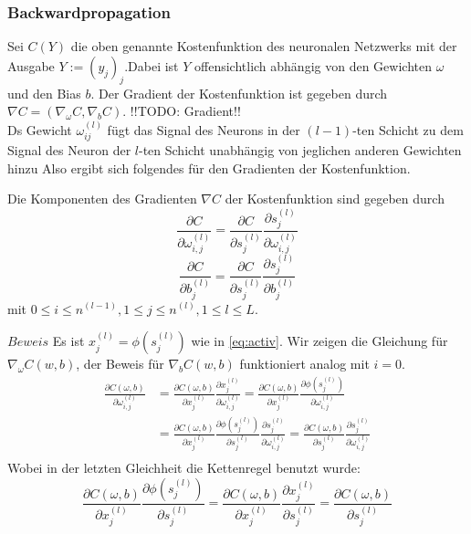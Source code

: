\subsubsection{Backwardpropagation}
Sei $C(Y)$ die oben genannte Kostenfunktion des neuronalen Netzwerks mit der Ausgabe $Y:=(y_j)_j$.Dabei ist $Y$
offensichtlich abhängig von den Gewichten $\omega$ und den Bias $b$. Der Gradient der Kostenfunktion ist gegeben durch
$\nabla C=(\nabla_{\omega}C,\nabla_{b}C).$  !!TODO: Gradient!!\\
Ds Gewicht $\omega_{ij}^{(l)}$ fügt das Signal des Neurons in der $(l-1)$-ten Schicht zu dem Signal des Neuron der $l$-ten
Schicht unabhängig von jeglichen anderen Gewichten hinzu Also ergibt sich folgendes für den Gradienten der
Kostenfunktion.
\begin{satz}
    \label{machine-cost-grad}
    Die Komponenten des Gradienten $\nabla C$ der Kostenfunktion sind gegeben durch
    \[
        \frac{\partial C}{\partial \omega_{i,j}^{(l)}} = \frac{\partial C}{\partial s_{j}^{(l)}} \frac{\partial s_{j}^{(l)}}{\partial \omega_{i,j}^{(l)}}
    \]
    \[
        \frac{\partial C}{\partial b_{j}^{(l)}} = \frac{\partial C}{\partial s_{j}^{(l)}} \frac{\partial s_{j}^{(l)}}{\partial b_j^{(l)}}
    \]
    mit $0\leq i \leq n^{(l-1)}, 1\leq j \leq n^{(l)}, 1 \leq l \leq L$.
\end{satz}
$Beweis$ Es ist $x_j^{(l)}=\phi(s_j^{(l)})$ wie in \eqref{eq:activ}. Wir zeigen die Gleichung für
$\nabla_{\omega}C(w,b)$, der Beweis für  $\nabla_{b}C(w,b)$ funktioniert analog mit $i=0$.
\begin{align*}
    \frac{\partial C(\omega,b)}{\partial \omega_{i,j}^{(l)}} &= \frac{\partial C(\omega,b)}{\partial x_j^{(l)}} \frac{\partial x_j^{(l)}}{\partial \omega_{i,j}^{(l)}}
    = \frac{\partial C(\omega,b)}{\partial x_j^{(l)}} \frac{\partial \phi(s_j^{(l)})}{\partial \omega_{i,j}^{(l)}} \\
    &=\frac{\partial C(\omega,b)}{\partial x_j^{(l)}} \frac{\partial \phi(s_j^{(l)})}{\partial s_j^{(l)}} \frac{\partial s_j^{(l)}}{\partial \omega_{i,j}^{(l)}}
    = \frac{\partial C(\omega,b)}{\partial s_{j}^{(l)}} \frac{\partial s_{j}^{(l)}}{\partial \omega_{i,j}^{(l)}} \\
\end{align*}
Wobei in der letzten Gleichheit die Kettenregel benutzt wurde:
\[
    \frac{\partial C(\omega,b)}{\partial x_j^{(l)}} \frac{\partial \phi(s_j^{(l)})}{\partial s_j^{(l)}}
    = \frac{\partial C(\omega,b)}{\partial x_j^{(l)}} \frac{\partial x_j^{(l)}}{\partial s_j^{(l)}}
    = \frac{\partial C(\omega,b)}{\partial s_j^{(l)}}
\]
